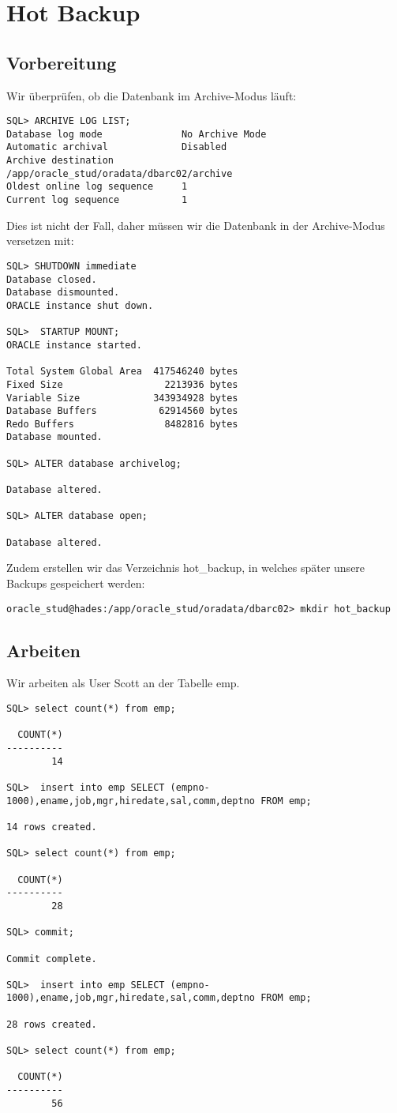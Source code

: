 \documentclass[11pt,a4paper,parskip=half]{scrartcl}
\begin{document}
\section{Hot Backup}
\subsection{Vorbereitung}
Wir überprüfen, ob die Datenbank im Archive-Modus läuft:
\begin{lstlisting}
SQL> ARCHIVE LOG LIST;
Database log mode              No Archive Mode
Automatic archival             Disabled
Archive destination            /app/oracle_stud/oradata/dbarc02/archive
Oldest online log sequence     1
Current log sequence           1
\end{lstlisting}

Dies ist nicht der Fall, daher müssen wir die Datenbank in der Archive-Modus versetzen mit:
\begin{lstlisting}
SQL> SHUTDOWN immediate
Database closed.
Database dismounted.
ORACLE instance shut down.

SQL>  STARTUP MOUNT;
ORACLE instance started.

Total System Global Area  417546240 bytes
Fixed Size                  2213936 bytes
Variable Size             343934928 bytes
Database Buffers           62914560 bytes
Redo Buffers                8482816 bytes
Database mounted.

SQL> ALTER database archivelog;

Database altered.

SQL> ALTER database open;

Database altered.
\end{lstlisting}

Zudem erstellen wir das Verzeichnis hot\_backup, in welches später unsere Backups gespeichert werden:
\begin{lstlisting}
oracle_stud@hades:/app/oracle_stud/oradata/dbarc02> mkdir hot_backup
\end{lstlisting}
\subsection{Arbeiten}
Wir arbeiten als User Scott an der Tabelle emp.

\begin{lstlisting}
SQL> select count(*) from emp;

  COUNT(*)
----------
        14

SQL>  insert into emp SELECT (empno-1000),ename,job,mgr,hiredate,sal,comm,deptno FROM emp;

14 rows created.

SQL> select count(*) from emp;

  COUNT(*)
----------
        28

SQL> commit;

Commit complete.

SQL>  insert into emp SELECT (empno-1000),ename,job,mgr,hiredate,sal,comm,deptno FROM emp;

28 rows created.

SQL> select count(*) from emp;

  COUNT(*)
----------
        56
\end{lstlisting}
\end{document}

